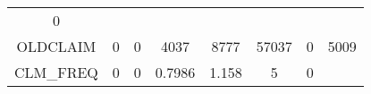 \documentclass[]{article}
\begin{document}
\begin{longtable}[]{@{}cccccccc@{}}
\begin{minipage}[t]{0.14\columnwidth}
0\strut
\end{minipage}\tabularnewline
\begin{minipage}[t]{0.11\columnwidth}\centering\strut
OLDCLAIM\strut
\end{minipage} & \begin{minipage}[t]{0.07\columnwidth}\centering\strut
0\strut
\end{minipage} & \begin{minipage}[t]{0.09\columnwidth}\centering\strut
0\strut
\end{minipage} & \begin{minipage}[t]{0.09\columnwidth}\centering\strut
4037\strut
\end{minipage} & \begin{minipage}[t]{0.09\columnwidth}\centering\strut
8777\strut
\end{minipage} & \begin{minipage}[t]{0.09\columnwidth}\centering\strut
57037\strut
\end{minipage} & \begin{minipage}[t]{0.13\columnwidth}\centering\strut
0\strut
\end{minipage} & \begin{minipage}[t]{0.14\columnwidth}\centering\strut
5009\strut
\end{minipage}\tabularnewline
\begin{minipage}[t]{0.11\columnwidth}\centering\strut
CLM\_FREQ\strut
\end{minipage} & \begin{minipage}[t]{0.07\columnwidth}\centering\strut
0\strut
\end{minipage} & \begin{minipage}[t]{0.09\columnwidth}\centering\strut
0\strut
\end{minipage} & \begin{minipage}[t]{0.09\columnwidth}\centering\strut
0.7986\strut
\end{minipage} & \begin{minipage}[t]{0.09\columnwidth}\centering\strut
1.158\strut
\end{minipage} & \begin{minipage}[t]{0.09\columnwidth}\centering\strut
5\strut
\end{minipage} & \begin{minipage}[t]{0.13\columnwidth}\centering\strut
0\strut
\end{minipage} & \begin{minipage}[t]{0.14\columnwidth}\centering\strut

\end{minipage}
\end{longtable}
\end{document}
